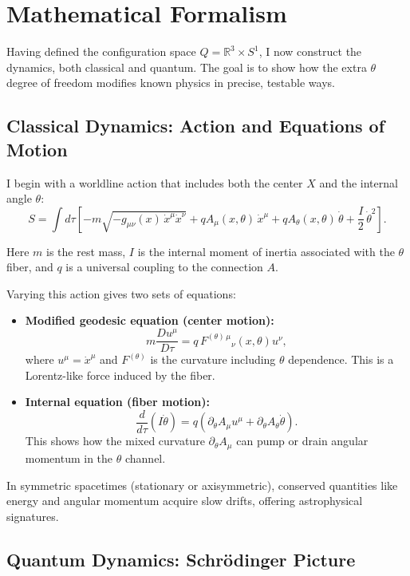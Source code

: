 \section{Mathematical Formalism}

Having defined the configuration space $Q = \mathbb{R}^3 \times S^1$, I now construct
the dynamics, both classical and quantum. The goal is to show how the extra
$\theta$ degree of freedom modifies known physics in precise, testable ways.

\subsection{Classical Dynamics: Action and Equations of Motion}

I begin with a worldline action that includes both the center $X$ and the internal
angle $\theta$:
\begin{equation}
S = \int d\tau \left[
 -m \sqrt{-g_{\mu\nu}(x)\, \dot{x}^\mu \dot{x}^\nu}
 + q A_\mu(x,\theta)\, \dot{x}^\mu
 + q A_\theta(x,\theta)\, \dot{\theta}
 + \frac{I}{2}\, \dot{\theta}^2
 \right].
\end{equation}

Here $m$ is the rest mass, $I$ is the internal moment of inertia associated with the $\theta$ fiber,
and $q$ is a universal coupling to the connection $A$.

Varying this action gives two sets of equations:

\begin{itemize}
  \item \textbf{Modified geodesic equation (center motion):}
  \[
  m \frac{D u^\mu}{D\tau} = q\, F^{(\theta)\,\mu}{}_{\nu}(x,\theta) u^\nu,
  \]
  where $u^\mu = \dot{x}^\mu$ and $F^{(\theta)}$ is the curvature including $\theta$ dependence.
  This is a Lorentz-like force induced by the fiber.
  
  \item \textbf{Internal equation (fiber motion):}
  \[
  \frac{d}{d\tau}(I \dot{\theta}) = q \left( \partial_\theta A_\mu u^\mu + \partial_\theta A_\theta \dot{\theta} \right).
  \]
  This shows how the mixed curvature $\partial_\theta A_\mu$ can pump or drain angular momentum
  in the $\theta$ channel.
\end{itemize}

In symmetric spacetimes (stationary or axisymmetric), conserved quantities like energy
and angular momentum acquire slow drifts, offering astrophysical signatures.

\subsection{Quantum Dynamics: Schrödinger Picture}

